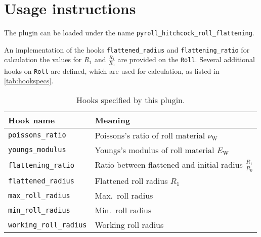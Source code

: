 \documentclass[11pt]{PyRollDocs}
\begin{document}
    \section{Usage instructions}\label{sec:usage-instructions}

    The plugin can be loaded under the name \texttt{pyroll\_hitchcock\_roll\_flattening}.

    An implementation of the hooks \lstinline{flattened_radius} and \lstinline{flattening_ratio}
    for calculation the values for $R_1$ and $\frac{R_1}{R_0}$ are provided on the \lstinline{Roll}.
    Several additional hooks on \lstinline{Roll} are defined, which are used for calculation, as listed in \autoref{tab:hookspecs}.

    \begin{table}
        \centering
        \caption{Hooks specified by this plugin.}
        \label{tab:hookspecs}
        \begin{tabular}{ll}
            \toprule
            Hook name                      & Meaning                                                      \\
            \midrule
            \texttt{poissons\_ratio}       & Poissons's ratio of roll material $\nu_\mathrm{W}$           \\
            \texttt{youngs\_modulus}       & Youngs's modulus of roll material $E_\mathrm{W}$             \\
            \texttt{flattening\_ratio}     & Ratio between flattened and initial radius $\frac{R_1}{R_0}$ \\
            \texttt{flattened\_radius}     & Flattened roll radius $R_1$                                  \\
            \texttt{max\_roll\_radius}     & Max.~roll radius                                             \\
            \texttt{min\_roll\_radius}     & Min.~roll radius                                             \\
            \texttt{working\_roll\_radius} & Working roll radius                                          \\
            \bottomrule
        \end{tabular}
    \end{table}

    \printbibliography
\end{document}
